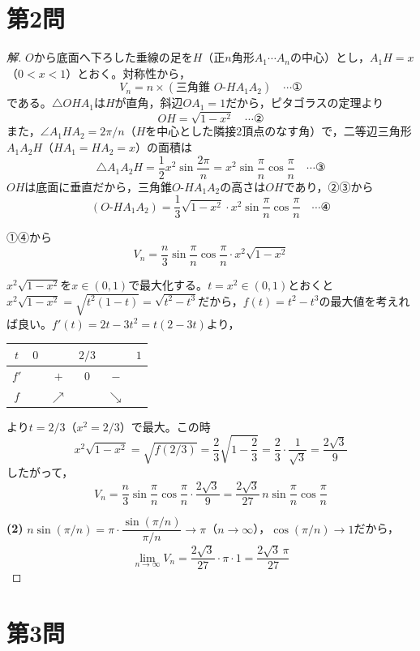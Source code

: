 \documentclass[../main.tex]{subfiles}
\begin{document}
\newpage

\section*{第2問}

\begin{proof}[解]
  $O$から底面へ下ろした垂線の足を$H$（正$n$角形$A_1\cdots A_n$の中心）とし，$A_1H=x$（$0<x<1$）とおく。対称性から，
  \[
    V_n=n\times(\text{三角錐 } O\text{-}HA_1A_2) \quad\cdots\text{①}
  \]
  である。$\triangle OHA_1$は$H$が直角，斜辺$OA_1=1$だから，ピタゴラスの定理より
  \[
    OH=\sqrt{1-x^2} \quad\cdots\text{②}
  \]
  また，$\angle A_1HA_2=2\pi/n$（$H$を中心とした隣接2頂点のなす角）で，二等辺三角形$A_1A_2H$（$HA_1=HA_2=x$）の面積は
  \[
    \triangle A_1A_2H=\frac12x^2\sin\frac{2\pi}n=x^2\sin\frac\pi n\cos\frac\pi n \quad\cdots\text{③}
  \]
  $OH$は底面に垂直だから，三角錐$O$-$HA_1A_2$の高さは$OH$であり，②③から
  \[
    (O\text{-}HA_1A_2)=\frac13\sqrt{1-x^2}\cdot x^2\sin\frac\pi n\cos\frac\pi n \quad\cdots\text{④}
  \]

  ①④から
  \[
    V_n=\frac n3\sin\frac\pi n\cos\frac\pi n\cdot x^2\sqrt{1-x^2}
  \]

  $x^2\sqrt{1-x^2}$を$x\in(0,1)$で最大化する。$t=x^2\in(0,1)$とおくと$x^2\sqrt{1-x^2}=\sqrt{t^2(1-t)}=\sqrt{t^2-t^3}$だから，$f(t)=t^2-t^3$の最大値を考えれば良い。$f'(t)=2t-3t^2=t(2-3t)$より，
  \begin{center}
    \begin{tabular}{c|ccccc}
      $t$ & $0$ & & $2/3$ & & $1$ \\
      \hline
      $f'$ & & $+$ & $0$ & $-$ & \\
      \hline
      $f$ & & $\nearrow$ & & $\searrow$ &
    \end{tabular}
  \end{center}
  より$t=2/3$（$x^2=2/3$）で最大。この時
  \[
    x^2\sqrt{1-x^2}=\sqrt{f(2/3)}=\frac23\sqrt{1-\frac23}=\frac23\cdot\frac1{\sqrt3}=\frac{2\sqrt3}9
  \]
  したがって，
  \[
    V_n=\frac n3\sin\frac\pi n\cos\frac\pi n\cdot\frac{2\sqrt3}9=\frac{2\sqrt3}{27}\,n\sin\frac\pi n\cos\frac\pi n
  \]

  \textbf{(2)} $n\sin(\pi/n)=\pi\cdot\dfrac{\sin(\pi/n)}{\pi/n}\to\pi$（$n\to\infty$），$\cos(\pi/n)\to1$だから，
  \[
    \lim_{n\to\infty}V_n=\frac{2\sqrt3}{27}\cdot\pi\cdot1=\frac{2\sqrt3\,\pi}{27}
  \]
\end{proof}

\newpage

\section*{第3問}
\end{document}
